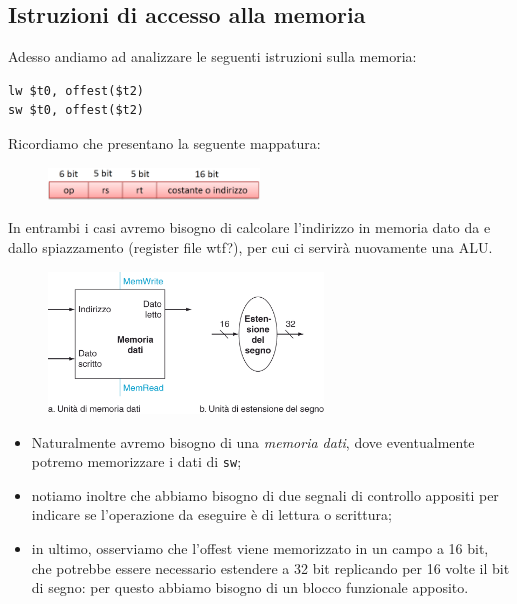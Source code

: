 \documentclass[class=book, crop=false, oneside]{standalone}
\begin{document}
\subsection{Istruzioni di accesso alla memoria}
Adesso andiamo ad analizzare le seguenti istruzioni sulla memoria:
\begin{verbatim}
lw $t0, offest($t2)
sw $t0, offest($t2)
\end{verbatim}
Ricordiamo che presentano la seguente mappatura:
\begin{figure}[H]
	\centering
	\includegraphics[width=0.5\textwidth,keepaspectratio]{I.png}
\end{figure}
In entrambi i casi avremo bisogno di calcolare l'indirizzo in memoria dato da  e dallo spiazzamento (register file wtf?), per cui ci servirà nuovamente una ALU.
\begin{figure}[H]
	\centering
	\includegraphics[width=0.65\textwidth,keepaspectratio]{MemAccess.png}
\end{figure}
\begin{itemize}
	\item Naturalmente avremo bisogno di una \emph{memoria dati}, dove eventualmente potremo memorizzare i dati di \texttt{sw};
	\item notiamo inoltre che abbiamo bisogno di due segnali di controllo appositi per indicare se l'operazione da eseguire è di lettura o scrittura;
	\item in ultimo, osserviamo che l'offest viene memorizzato in un campo a 16 bit, che potrebbe essere necessario estendere a 32 bit replicando per 16 volte il bit di segno: per questo abbiamo bisogno di un blocco funzionale apposito.
\end{itemize}
\end{document}
